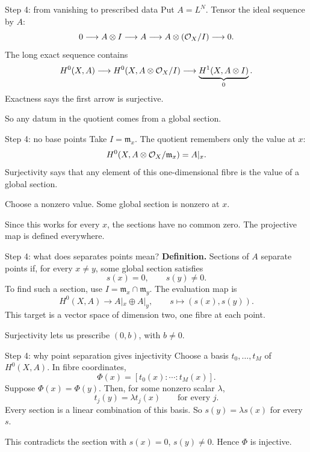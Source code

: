 \begin{frame}{Step 4: from vanishing to prescribed data}
Put \(A=L^N\). Tensor the ideal sequence by \(A\):
\[
0\longrightarrow A\otimes I\longrightarrow A
\longrightarrow A\otimes(\mathcal O_X/I)\longrightarrow0.
\]
The long exact sequence contains
\[
H^0(X,A)\longrightarrow H^0(X,A\otimes\mathcal O_X/I)
\longrightarrow\underbrace{H^1(X,A\otimes I)}_{0}.
\]
Exactness says the first arrow is surjective.
\par\medskip
So any datum in the quotient comes from a global section.
\end{frame}

\begin{frame}{Step 4: no base points}
Take \(I=\mathfrak m_x\). The quotient remembers only the value at \(x\):
\[
H^0(X,A\otimes\mathcal O_X/\mathfrak m_x)=A|_x.
\]
Surjectivity says that any element of this one-dimensional fibre is the value of a global section.
\par\medskip
Choose a nonzero value. Some global section is nonzero at \(x\).
\par\medskip
Since this works for every \(x\), the sections have no common zero. The projective map is defined everywhere.
\end{frame}

\begin{frame}{Step 4: what does separates points mean?}
\textbf{Definition.} Sections of \(A\) separate points if, for every \(x\ne y\), some global section satisfies
\[
s(x)=0,\qquad s(y)\ne0.
\]
To find such a section, use \(I=\mathfrak m_x\cap\mathfrak m_y\). The evaluation map is
\[
H^0(X,A)\longrightarrow A|_x\oplus A|_y,\qquad
s\longmapsto(s(x),s(y)).
\]
This target is a vector space of dimension two, one fibre at each point.
\par\medskip
Surjectivity lets us prescribe \((0,b)\), with \(b\ne0\).
\end{frame}

\begin{frame}{Step 4: why point separation gives injectivity}
Choose a basis \(t_0,\ldots,t_M\) of \(H^0(X,A)\). In fibre coordinates,
\[
\Phi(x)=[t_0(x):\cdots:t_M(x)].
\]
Suppose \(\Phi(x)=\Phi(y)\). Then, for some nonzero scalar \(\lambda\),
\[
t_j(y)=\lambda t_j(x)\qquad\text{for every }j.
\]
Every section is a linear combination of this basis. So \(s(y)=\lambda s(x)\) for every \(s\).
\par\medskip
This contradicts the section with \(s(x)=0\), \(s(y)\ne0\). Hence \(\Phi\) is injective.
\end{frame}




